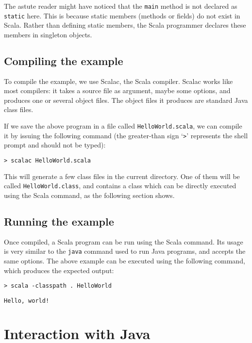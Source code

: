 \documentclass[a4paper,12pt,twoside,titlepage]{article}
\begin{document}
The astute reader might have noticed that the \lstinline?main? method is
not declared as \lstinline?static? here. This is because static members
(methods or fields) do not exist in Scala. Rather than defining static
members, the Scala programmer declares these members in singleton
objects.

\subsection{Compiling the example}
\label{sec:compiling-example}

To compile the example, we use Scalac, the Scala compiler. Scalac
works like most compilers: it takes a source file as argument, maybe
some options, and produces one or several object files. The object
files it produces are standard Java class files.

If we save the above program in a file called
\lstinline?HelloWorld.scala?, we can compile it by issuing the following
command (the greater-than sign `\verb|>|' represents the shell prompt
and should not be typed):
\begin{verbatim}
> scalac HelloWorld.scala
\end{verbatim}
This will generate a few class files in the current directory. One of
them will be called \lstinline?HelloWorld.class?, and contains a class
which can be directly executed using the Scala command, as the
following section shows.

\subsection{Running the example}
\label{sec:running-example}

Once compiled, a Scala program can be run using the Scala command.
Its usage is very similar to the \lstinline?java? command used to run Java
programs, and accepts the same options. The above example can be
executed using the following command, which produces the expected
output:
\begin{verbatim}
> scala -classpath . HelloWorld
\end{verbatim}
\begin{verbatim}
Hello, world!
\end{verbatim}

\section{Interaction with Java}
\label{sec:inter-with-java}
\end{document}
